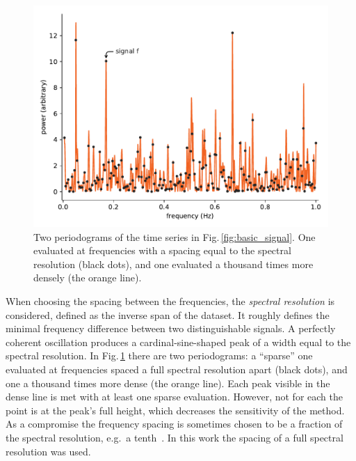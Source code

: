 \begin{figure}
  \centering
  \includegraphics[width=\linewidth]{gfx/axions/basic_periodogram.pdf}
  \caption{Two periodograms of the time series in Fig.\,\ref{fig:basic_signal}. One evaluated at frequencies with a spacing equal to the spectral resolution (black dots), and one evaluated a thousand times more densely (the orange line).}\label{fig:basic_periodogram}
\end{figure}

When choosing the spacing between the frequencies, the \emph{spectral resolution} is considered, defined as the inverse span of the dataset.
It roughly defines the minimal frequency difference between two distinguishable signals. A perfectly coherent oscillation produces a cardinal-sine-shaped peak of a width equal to the spectral resolution. 
In Fig.\,\ref{fig:basic_periodogram} there are two periodograms: a ``sparse'' one evaluated at frequencies spaced a full spectral resolution apart (black dots), and one a thousand times more dense (the orange line).
Each peak visible in the dense line is met with at least one sparse evaluation. However, not for each the point is at the peak's full height, which decreases the sensitivity of the method. As a compromise the frequency spacing is sometimes chosen to be a fraction of the spectral resolution, e.g.\ a tenth~\cite{Debosscher2007}. In this work the spacing of a full spectral resolution was used.

